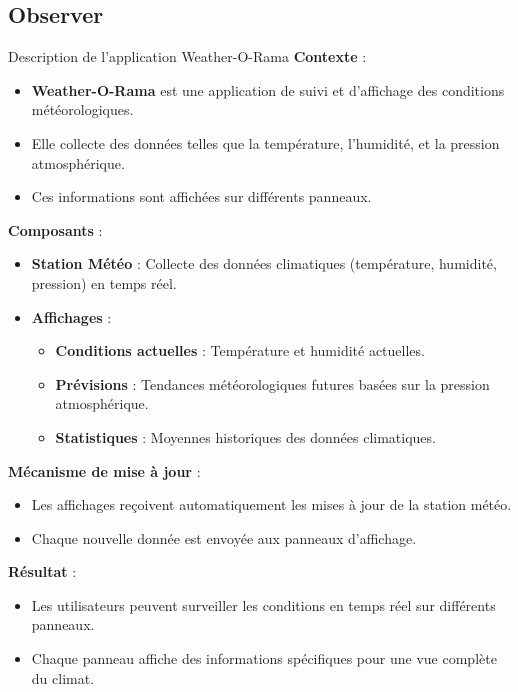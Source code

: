 \documentclass[aspectratio=169]{beamer}
\begin{document}
  \subsection{Observer}
  \begin{frame}{Description de l'application Weather-O-Rama}
    \textbf{Contexte} :
    \begin{itemize}
        \item \textbf{Weather-O-Rama} est une application de suivi et d'affichage des conditions météorologiques.
        \item Elle collecte des données telles que la température, l'humidité, et la pression atmosphérique.
        \item Ces informations sont affichées sur différents panneaux.
    \end{itemize}
    
    \textbf{Composants} :
    \begin{itemize}
        \item \textbf{Station Météo} : Collecte des données climatiques (température, humidité, pression) en temps réel.
        \item \textbf{Affichages} :
        \begin{itemize}
            \item \textbf{Conditions actuelles} : Température et humidité actuelles.
            \item \textbf{Prévisions} : Tendances météorologiques futures basées sur la pression atmosphérique.
            \item \textbf{Statistiques} : Moyennes historiques des données climatiques.
        \end{itemize}
    \end{itemize}
    
    \textbf{Mécanisme de mise à jour} :
    \begin{itemize}
        \item Les affichages reçoivent automatiquement les mises à jour de la station météo.
        \item Chaque nouvelle donnée est envoyée aux panneaux d'affichage.
    \end{itemize}
    
    \textbf{Résultat} :
    \begin{itemize}
        \item Les utilisateurs peuvent surveiller les conditions en temps réel sur différents panneaux.
        \item Chaque panneau affiche des informations spécifiques pour une vue complète du climat.
    \end{itemize}
  \end{frame}
\end{document}
